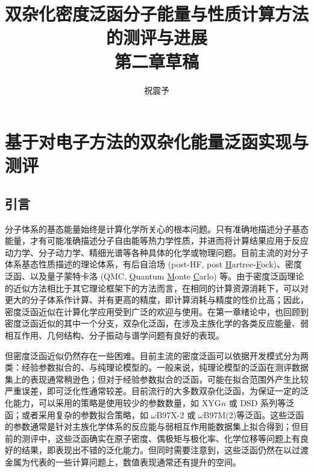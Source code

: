 



\title{\textbf{双杂化密度泛函分子能量与性质计算方法的测评与进展\\第二章草稿}}
\author{祝震予}
\maketitle
\vspace{-10pt}

\tableofcontents


\setcounter{section}{1}

\section{基于对电子方法的双杂化能量泛函实现与测评}

\subsection{引言}

分子体系的基态能量始终是计算化学所关心的根本问题。只有准确地描述分子基态能量，才有可能准确描述分子自由能等热力学性质，并进而将计算结果应用于反应动力学、分子动力学、精细光谱等各种具体的化学或物理问题。目前主流的对分子体系基态性质描述的理论体系，有后自洽场 (post-HF, post \underline{H}artree-\underline{F}ock)、密度泛函、以及量子蒙特卡洛 (QMC, \underline{Q}uantum \underline{M}onte \underline{C}arlo) 等。由于密度泛函理论的近似方法相比于其它理论框架下的方法而言，在相同的计算资源消耗下，可以对更大的分子体系作计算、并有更高的精度，即计算消耗与精度的性价比高；因此，密度泛函近似在计算化学应用受到广泛的欢迎与使用。在第一章绪论中，也回顾到密度泛函近似的其中一个分支，双杂化泛函，在涉及主族化学的各类反应能量、弱相互作用、几何结构、分子振动与谱学问题有良好的表现。

但密度泛函近似仍然存在一些困难。目前主流的密度泛函可以依据开发模式分为两类：经验参数拟合的、与纯理论模型的。一般来说，纯理论模型的泛函在测评数据集上的表现通常稍逊色\cite{Goerigk-Grimme.PCCP.2017}；但对于经验参数拟合的泛函，可能在拟合范围外产生比较严重误差，即可泛化性通常较差\cite{Medvedev-Lyssenko.S.2017}。目前流行的大多数双杂化泛函，为保证一定的泛化能力，可以采用的策略是使用较少的参数数量，如 XYG$n$\cite{Zhang-Xu.JPCL.2021} 或 DSD 系列\cite{Kozuch-Martin.JCC.2013}等泛函；或者采用复杂的参数拟合策略，如 $\omega$B97X-2\cite{Chai-Head-Gordon.JCP.2009} 或 $\omega$B97M(2)\cite{Mardirossian-Head-Gordon.JCP.2018}等泛函。这些泛函的参数通常是针对主族化学体系的反应能与弱相互作用能数据集上拟合得到；但目前的测评中，这些泛函确实在原子密度\cite{Su-Xu.PNAS.2018}、偶极矩与极化率\cite{Hait-Head-Gordon.JCTC.2018, Hait-Head-Gordon.PCCP.2018}、化学位移\cite{Stoychev-Neese.JCTC.2018}等问题上有良好的结果，即表现出不错的泛化能力。但同时需要注意到，这些泛函仍然在以过渡金属为代表的一些计算问题上，数值表现通常还有提升的空间。

